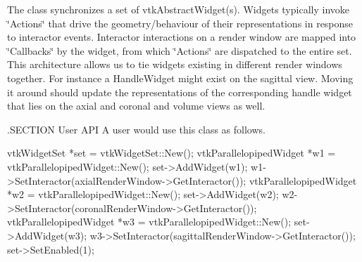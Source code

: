 The class synchronizes a set of vtk\-Abstract\-Widget(s). Widgets typically invoke \char`\"{}\-Actions\char`\"{} that drive the geometry/behaviour of their representations in response to interactor events. Interactor interactions on a render window are mapped into \char`\"{}\-Callbacks\char`\"{} by the widget, from which \char`\"{}\-Actions\char`\"{} are dispatched to the entire set. This architecture allows us to tie widgets existing in different render windows together. For instance a Handle\-Widget might exist on the sagittal view. Moving it around should update the representations of the corresponding handle widget that lies on the axial and coronal and volume views as well.

.S\-E\-C\-T\-I\-O\-N User A\-P\-I A user would use this class as follows. \begin{DoxyVerb} vtkWidgetSet *set = vtkWidgetSet::New();
 vtkParallelopipedWidget *w1 = vtkParallelopipedWidget::New();
 set->AddWidget(w1);
 w1->SetInteractor(axialRenderWindow->GetInteractor());
 vtkParallelopipedWidget *w2 = vtkParallelopipedWidget::New();
 set->AddWidget(w2);
 w2->SetInteractor(coronalRenderWindow->GetInteractor());
 vtkParallelopipedWidget *w3 = vtkParallelopipedWidget::New();
 set->AddWidget(w3);
 w3->SetInteractor(sagittalRenderWindow->GetInteractor());
 set->SetEnabled(1);\end{DoxyVerb}


